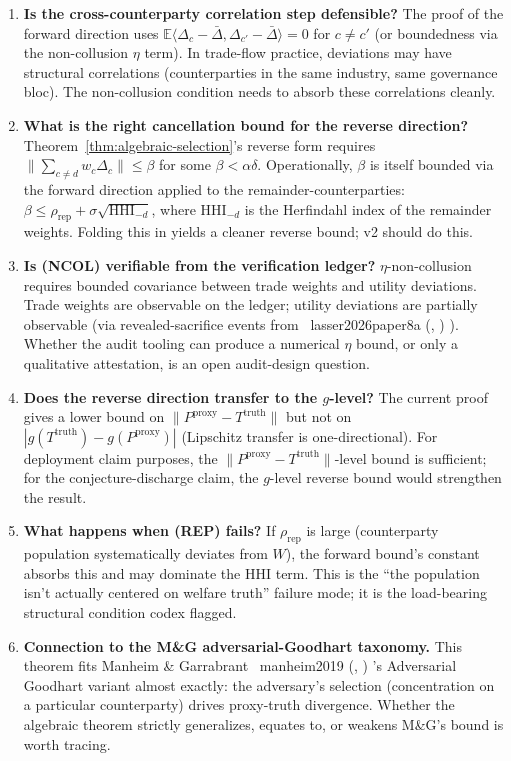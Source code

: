 \documentclass{article}
\makeatletter
\newcommand{\citep}[2][]{%
  \begingroup
  \def\@tmpkey{#2}%
  \ifx\@tmpkey\@empty\else
    (\ifx\@empty#1\@empty\else #1, \fi
     \@nameuse{bibkey@\@tmpkey})%
  \fi
  \endgroup
}
\newcommand{\HHI}{\mathrm{HHI}}
\newcommand{\Pproxy}{P^{\mathrm{proxy}}}
\newcommand{\Ttruth}{T^{\mathrm{truth}}}
\makeatother
\begin{document}
\begin{enumerate}
\item \textbf{Is the cross-counterparty correlation step
  defensible?}  The proof of the forward direction uses
  $\mathbb{E}\langle \Delta_c - \bar\Delta, \Delta_{c'} - \bar\Delta
  \rangle = 0$ for $c \neq c'$ (or boundedness via the
  non-collusion $\eta$ term).  In trade-flow practice, deviations
  may have structural correlations (counterparties in the same
  industry, same governance bloc).  The non-collusion condition
  needs to absorb these correlations cleanly.

\item \textbf{What is the right cancellation bound for the reverse
  direction?}  Theorem~\ref{thm:algebraic-selection}'s reverse
  form requires $\big\|\sum_{c \neq d} w_c \Delta_c\big\| \leq \beta$
  for some $\beta < \alpha \delta$.  Operationally, $\beta$ is
  itself bounded via the forward direction applied to the
  remainder-counterparties: $\beta \leq \rho_\mathrm{rep} +
  \sigma \sqrt{\HHI_{-d}}$, where $\HHI_{-d}$ is the Herfindahl
  index of the remainder weights.  Folding this in yields a
  cleaner reverse bound; v2 should do this.

\item \textbf{Is (NCOL) verifiable from the verification ledger?}
  $\eta$-non-collusion requires bounded covariance between trade
  weights and utility deviations.  Trade weights are observable
  on the ledger; utility deviations are partially observable
  (via revealed-sacrifice events from~\citep{lasser2026paper8a}).
  Whether the audit tooling can produce a numerical $\eta$ bound,
  or only a qualitative attestation, is an open audit-design
  question.

\item \textbf{Does the reverse direction transfer to the
  $g$-level?}  The current proof gives a lower bound on
  $\|\Pproxy - \Ttruth\|$ but not on $|g(\Ttruth) - g(\Pproxy)|$
  (Lipschitz transfer is one-directional).  For deployment claim
  purposes, the $\|\Pproxy - \Ttruth\|$-level bound is
  sufficient; for the conjecture-discharge claim, the
  $g$-level reverse bound would strengthen the result.

\item \textbf{What happens when (REP) fails?}  If
  $\rho_\mathrm{rep}$ is large (counterparty population
  systematically deviates from $W$), the forward bound's
  constant absorbs this and may dominate the $\HHI$ term.  This
  is the ``the population isn't actually centered on welfare
  truth'' failure mode; it is the load-bearing structural
  condition codex flagged.

\item \textbf{Connection to the M\&G adversarial-Goodhart
  taxonomy.}  This theorem fits Manheim \&
  Garrabrant~\citep{manheim2019}'s Adversarial Goodhart variant
  almost exactly: the adversary's selection (concentration on a
  particular counterparty) drives proxy-truth divergence.
  Whether the algebraic theorem strictly generalizes, equates to,
  or weakens M\&G's bound is worth tracing.
\end{enumerate}
\end{document}

